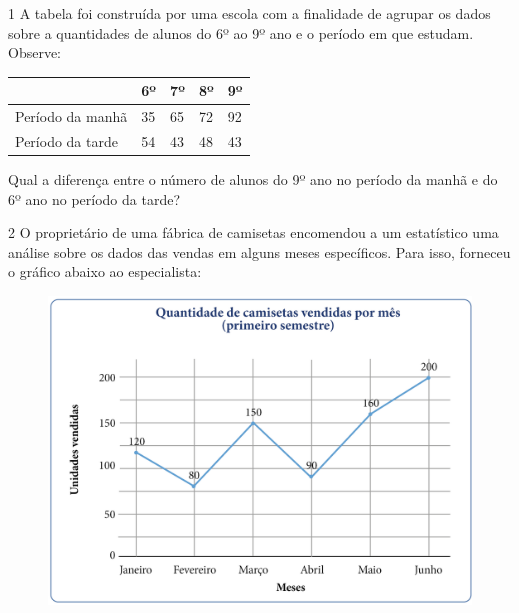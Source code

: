 
\num{1} A tabela foi construída por uma escola com a finalidade de agrupar
os dados sobre a quantidades de alunos do 6º ao 9º ano e o período
em que estudam. Observe:

\begin{longtable}[]{@{}lllll@{}}
\toprule
& 6º & 7º & 8º & 9º\tabularnewline
\midrule
\endhead
Período da manhã & 35 & 65 & 72 & 92\tabularnewline
Período da tarde & 54 & 43 & 48 & 43\tabularnewline
\bottomrule
\end{longtable}

Qual a diferença entre o número de alunos do 9º ano no período da manhã
e do 6º ano no período da tarde?


\pagebreak
\num{2} O proprietário de uma fábrica de camisetas encomendou a um
estatístico uma análise sobre os dados das vendas em alguns
meses específicos. Para isso, forneceu o gráfico abaixo ao especialista:

\begin{figure}[htpb!]
\includegraphics[width=\textwidth]{../ilustracoes/MAT5/SAEB_5ANO_MAT_figura101.png}
\end{figure}

